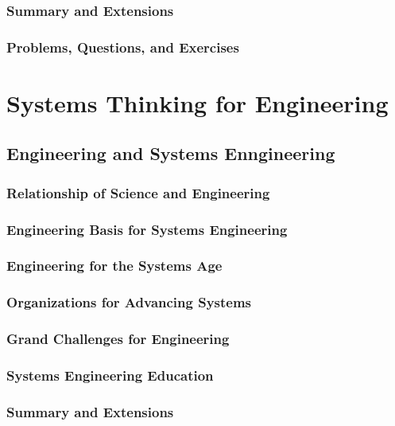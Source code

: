 \documentclass[11pt,fleqn]{book} %
\begin{document}
    \section*{Summary and Extensions}
    \section*{Problems, Questions, and Exercises}

\part{Systems Thinking for Engineering}
\label{part:systems-thinking-for}

    \chapter{Engineering and Systems Enngineering}
    \section{Relationship of Science and Engineering}
    \section{Engineering Basis for Systems Engineering}
    \section{Engineering for the Systems Age}
    \section{Organizations for Advancing Systems}
    \section{Grand Challenges for Engineering}
    \section{Systems Engineering Education}
    \section*{Summary and Extensions}
\end{document}
